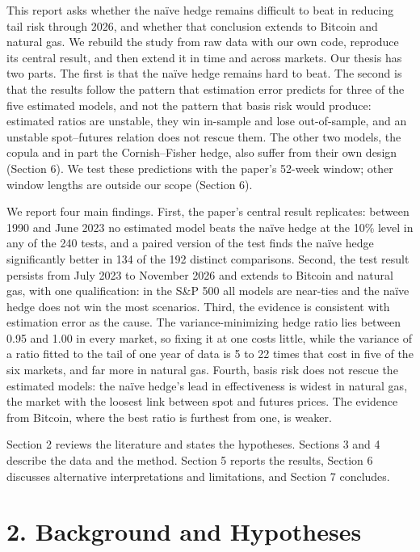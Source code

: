 \documentclass[11pt,letterpaper]{article}
\begin{document}
This report asks whether the naïve hedge remains difficult to beat in reducing tail risk through 2026, and whether that conclusion extends to Bitcoin and natural gas. We rebuild the study from raw data with our own code, reproduce its central result, and then extend it in time and across markets. Our thesis has two parts. The first is that the naïve hedge remains hard to beat. The second is that the results follow the pattern that estimation error predicts for three of the five estimated models, and not the pattern that basis risk would produce: estimated ratios are unstable, they win in-sample and lose out-of-sample, and an unstable spot–futures relation does not rescue them. The other two models, the copula and in part the Cornish–Fisher hedge, also suffer from their own design (Section 6). We test these predictions with the paper's 52-week window; other window lengths are outside our scope (Section 6).

We report four main findings. First, the paper's central result replicates: between 1990 and June 2023 no estimated model beats the naïve hedge at the 10\% level in any of the 240 tests, and a paired version of the test finds the naïve hedge significantly better in 134 of the 192 distinct comparisons. Second, the test result persists from July 2023 to November 2026 and extends to Bitcoin and natural gas, with one qualification: in the S\&P 500 all models are near-ties and the naïve hedge does not win the most scenarios. Third, the evidence is consistent with estimation error as the cause. The variance-minimizing hedge ratio lies between 0.95 and 1.00 in every market, so fixing it at one costs little, while the variance of a ratio fitted to the tail of one year of data is 5 to 22 times that cost in five of the six markets, and far more in natural gas. Fourth, basis risk does not rescue the estimated models: the naïve hedge's lead in effectiveness is widest in natural gas, the market with the loosest link between spot and futures prices. The evidence from Bitcoin, where the best ratio is furthest from one, is weaker.

Section 2 reviews the literature and states the hypotheses. Sections 3 and 4 describe the data and the method. Section 5 reports the results, Section 6 discusses alternative interpretations and limitations, and Section 7 concludes.

\section*{2. Background and Hypotheses}
\end{document}
